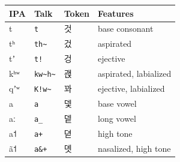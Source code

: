 \begin{center}
\begin{tabular}{>{\ipafont}l l >{\tokenfont}l l}
\toprule
IPA & Talk & Token & Features \\
\midrule
t & \texttt{t} & 것 & base consonant \\
tʰ & \texttt{th\textasciitilde{}} & 겄 & aspirated \\
tʼ & \texttt{t!} & 겅 & ejective \\
kʰʷ & \texttt{kw\textasciitilde{}h\textasciitilde{}} & 괝 & aspirated, labialized \\
qʼʷ & \texttt{K!w\textasciitilde{}} & 꽈 & ejective, labialized \\
a & \texttt{a} & 뎇 & base vowel \\
aː & \texttt{a\_} & 뎉 & long vowel \\
a˦ & \texttt{a+} & 뎓 & high tone \\
ã˦ & \texttt{a\&+} & 뎻 & nasalized, high tone \\
\bottomrule
\end{tabular}
\end{center}

